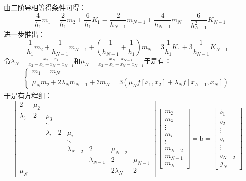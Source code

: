 \documentclass[a4paper]{article}
\begin{document}
由二阶导相等得条件可得：
\begin{equation}
    -\frac{4}{h_1}m_1 - \frac{2}{h_1}m_2 + \frac{6}{h_1}K_1 = \frac{2}{h_{N-1}}m_{N-1}+\frac{4}{h_{N-1}}m_N -\frac{6}{h_{N-1}^2}K_{N-1}
\end{equation}
进一步推出：
\begin{equation}
  \frac{1}{h_1} m_2 + \frac{1}{h_{N-1}} m_{N-1} +(\frac{1}{h_{N-1}}+ \frac{1}{h_1})m_N = 3\frac{1}{h_1}K_1 +3\frac{1}{h_{N-1}}K_{N-1}
\end{equation}
令$\lambda_N =\frac{x_2-x_1}{x_2-x_1 +x_N-x_{N-1}}$和$\mu_N = \frac{x_N-x_{N-1}}{x_2-x_1 +x_N-x_{N-1}}$于是有：
\begin{gather}
    \left\{
    \begin{array}{c}
    m_1 = m_N \\
        \mu_N m_2 + 2\lambda_N m_{N-1} + 2m_N = 3(\mu_Nf[x_1,x_2]+\lambda_N f[x_{N-1},x_N])
    \end{array}
    \right.
\end{gather}
于是有方程组：
\begin{equation}
\begin{bmatrix}2&\mu_2\\\lambda_3&2&\mu_3\\&&\ddots\\&&\lambda_i&2&\mu_i\\&&&&\ddots\\&&&&\lambda_{N-2}&2&\mu_{N-2}\\&&&&&\lambda_{N-1}&2 &\mu_{N-1} \\
\mu_N&&&&&&2\lambda_N &2 \end{bmatrix}
\begin{bmatrix}m_2\\m_3\\\vdots\\m_i\\\vdots\\m_{N-2}\\m_{N-1}\\
m_N\end{bmatrix}=\mathrm{b} = \begin{bmatrix}
    b_1 \\
    b_2 \\
    \vdots \\
    b_i \\
    \vdots \\
    b_{N-2}\\
    g_N
\end{bmatrix}
\end{equation}
\end{document}
